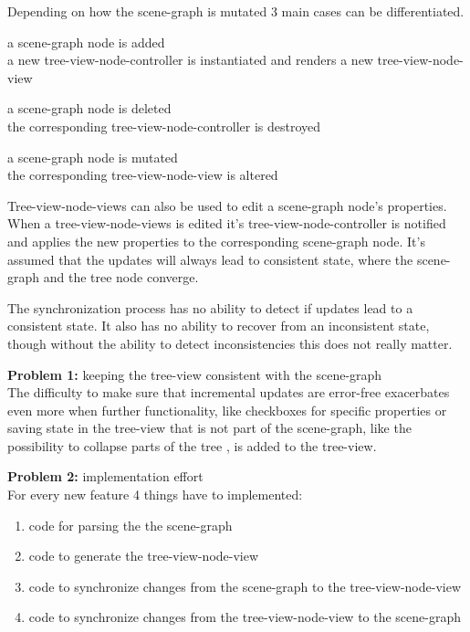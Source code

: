 Depending on how the scene-graph is mutated 3 main cases can be
differentiated.

\begin{description*}
  \item a scene-graph node is added \hfill \\
    a new tree-view-node-controller is instantiated and renders a new tree-view-node-view
  \item a scene-graph node is deleted \hfill \\
    the corresponding tree-view-node-controller is destroyed
  \item a scene-graph node is mutated \hfill \\
    the corresponding tree-view-node-view is altered
\end{description*}

Tree-view-node-views can also be used to edit a scene-graph node's
properties.\\
When a tree-view-node-views is edited it's tree-view-node-controller is
notified and applies the new properties to the corresponding scene-graph
node. It's assumed that the updates will always lead to consistent
state, where the scene-graph and the tree node converge.

The synchronization process has no ability to detect if updates lead to
a consistent state. It also has no ability to recover from an
inconsistent state, though without the ability to detect inconsistencies
this does not really matter.

\textbf{Problem 1:} keeping the tree-view consistent with the
scene-graph\\
The difficulty to make sure that incremental updates are error-free
exacerbates even more when further functionality, like checkboxes for
specific properties or saving state in the tree-view that is not part of
the scene-graph, like the possibility to collapse parts of the tree , is
added to the tree-view.

\textbf{Problem 2:} implementation effort\\
For every new feature 4 things have to implemented:\\
\begin{enumerate}
  \item code for parsing the the scene-graph
  \item code to generate the tree-view-node-view
  \item code to synchronize changes from the scene-graph to the tree-view-node-view
  \item code to synchronize changes from the tree-view-node-view to the scene-graph
\end{enumerate}

